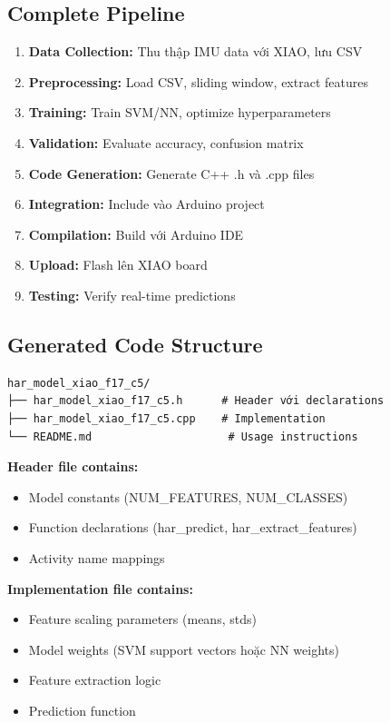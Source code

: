 \subsection{Complete Pipeline}
\begin{enumerate}
    \item \textbf{Data Collection:} Thu thập IMU data với XIAO, lưu CSV
    \item \textbf{Preprocessing:} Load CSV, sliding window, extract features
    \item \textbf{Training:} Train SVM/NN, optimize hyperparameters
    \item \textbf{Validation:} Evaluate accuracy, confusion matrix
    \item \textbf{Code Generation:} Generate C++ .h và .cpp files
    \item \textbf{Integration:} Include vào Arduino project
    \item \textbf{Compilation:} Build với Arduino IDE
    \item \textbf{Upload:} Flash lên XIAO board
    \item \textbf{Testing:} Verify real-time predictions
\end{enumerate}

\subsection{Generated Code Structure}
\begin{verbatim}
har_model_xiao_f17_c5/
├── har_model_xiao_f17_c5.h      # Header với declarations
├── har_model_xiao_f17_c5.cpp    # Implementation
└── README.md                     # Usage instructions
\end{verbatim}

\textbf{Header file contains:}
\begin{itemize}
    \item Model constants (NUM\_FEATURES, NUM\_CLASSES)
    \item Function declarations (har\_predict, har\_extract\_features)
    \item Activity name mappings
\end{itemize}

\textbf{Implementation file contains:}
\begin{itemize}
    \item Feature scaling parameters (means, stds)
    \item Model weights (SVM support vectors hoặc NN weights)
    \item Feature extraction logic
    \item Prediction function
\end{itemize}

